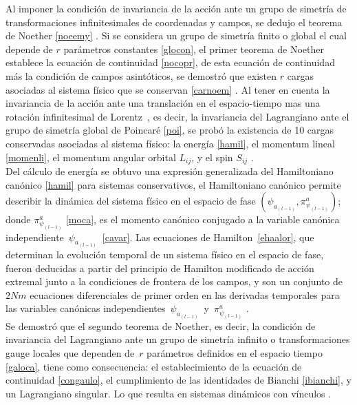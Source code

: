 \documentclass[a4paper,12pt]{article}
\begin{document}
Al imponer la condición de invariancia de la acción ante un grupo de simetría de transformaciones \mbox{infinitesimales} de coordenadas y campos, se dedujo el teorema de Noether \eqref{noeemy} \cite{vinculos}. Si se considera un grupo de simetría finito o global el cual depende de $r$ parámetros constantes \eqref{glocon}, el primer teorema de Noether establece la ecuación de continuidad \eqref{nocopr}, de esta ecuación de continuidad más la condición de campos asintóticos, se demostró que existen $r$ cargas asociadas al sistema físico que se conservan \eqref{carnoem} \cite{greiner}. Al tener en cuenta la invariancia de la acción ante una translación en el \mbox{espacio-tiempo} mas una rotación infinitesimal de \mbox{Lorentz \cite{greiner}}, es decir, la invariancia del Lagrangiano ante el grupo de simetría global de Poincaré \eqref{poi}, se probó la existencia de 10 cargas conservadas asociadas al sistema físico: la energía \eqref{hamil}, el momentum lineal \eqref{momenli}, el momentum angular orbital $L_{ij}$, y el spin $S_{ij}$ \cite{greiner}. 
\\

Del cálculo de energía se obtuvo una expresión generalizada del Hamiltoniano canónico \eqref{hamil} para sistemas conservativos, el Hamiltoniano canónico permite describir la dinámica del sistema físico en el espacio de fase $(\psi_{a_{(l-1)}},\pi^{a}_{\psi_{(l-1)}})$; donde $\pi^{a}_{\psi_{(l-1)}}$ \eqref{moca}, es el momento canónico conjugado a la variable canónica \mbox{independiente $\psi_{a_{(l-1)}}$ \eqref{cavar}.} Las ecuaciones de \mbox{Hamilton \eqref{ehaalor},} que \mbox{determinan} la evolución temporal de un sistema físico en el espacio de fase, fueron deducidas a partir del principio de Hamilton modificado de acción extremal junto a la condiciones de frontera de los \mbox{campos,} y son un conjunto de $2Nm$ ecuaciones \mbox{diferenciales} de primer orden en las derivadas \mbox{temporales} para las variables canónicas \mbox{independientes $\psi_{a_{(l-1)}}$ y $\pi^{a}_{\psi_{(l-1)}}$} \cite{general}. 
\\

Se demostró que el segundo teorema de Noether, es decir, la condición de \mbox{invariancia} del Lagrangiano ante un grupo de simetría infinito o transformaciones gauge \mbox{locales} que dependen \mbox{de $r$} parámetros definidos en el espacio tiempo \eqref{galoca}, tiene como \mbox{consecuencia:} el establecimiento de la ecuación de continuidad \eqref{congaulo}, el \mbox{cumplimiento} de las identidades de Bianchi \eqref{ibianchi}, y un Lagrangiano singular. Lo que resulta en sistemas dinámicos con vínculos \cite{vinculos}.
\\
\end{document}
